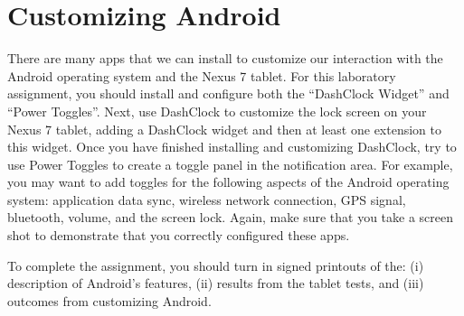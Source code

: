 \section*{Customizing Android}

There are many apps that we can install to customize our interaction with the Android operating system and the Nexus 7
tablet.  For this laboratory assignment, you should install and configure both the ``DashClock Widget'' and ``Power
Toggles''.  Next, use DashClock to customize the lock screen on your Nexus 7 tablet, adding a DashClock widget and then
at least one extension to this widget.  Once you have finished installing and customizing DashClock, try to use 
Power Toggles to create a toggle panel in the notification area.  For example, you may want to add toggles for the
following aspects of the Android operating system: application data sync, wireless network connection, GPS signal,
bluetooth, volume, and the screen lock.  Again, make sure that you take a screen shot to demonstrate that you correctly
configured these apps.

To complete the assignment, you should turn in signed printouts of the: (i) description of Android's features, (ii)
results from the tablet tests, and (iii) outcomes from customizing Android.


